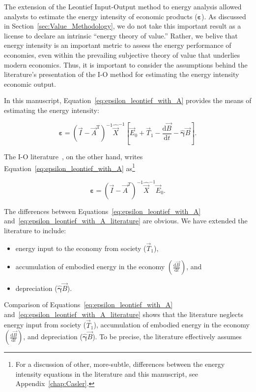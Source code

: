 The extension of the Leontief Input-Output method
to energy analysis allowed analysts to estimate 
the energy intensity 
of economic products ($\bm{\varepsilon}$). 
As discussed in Section~\ref{sec:Value_Methodology},
we do not take this important result as a license
to declare an intrinsic ``energy theory of value.''
Rather, we belive that energy intensity is an 
important metric to assess the energy performance of economies,
even within the prevailing subjective theory of value
that underlies modern economics. 
Thus, it is important to consider the assumptions behind
the literature's presentation of the I-O method 
for estimating the energy intensity economic output.

In this manuscript, Equation~\ref{eq:epsilon_leontief_with_A} 
provides the means of estimating the energy intensity:

\begin{equation*}
	\bm{\varepsilon} 
	= {(\vec{I} - \vec{A}^{\mathrm{T}})}^{-1}\hat{\vec{X}}^{-1}
		\left[\vec{E}_{0} 
				+ \vec{T}_{1} 
				- \frac{\mathrm{d}\vec{B}}{\mathrm{d}t} 
				- \hat{\bm{\gamma}}\vec{B}
		\right].
\end{equation*}

\noindent{}The I-O literature~\cite{Bullard1975,Casler1984}, 
on the other hand, 
writes Equation~\ref{eq:epsilon_leontief_with_A} 
as\footnote{For a discussion of other, more-subtle, differences
between the energy intensity equations in the literature
and this manuscript, see Appendix~\ref{chap:Casler}.}

\begin{equation} \label{eq:epsilon_leontief_with_A_literature}
	\bm{\varepsilon} 
	= {(\vec{I} - \vec{A}^{T})}^{-1}
	\hat{\vec{X}}^{-1}
	\vec{E}_{0}.
\end{equation}

The differences between Equations~\ref{eq:epsilon_leontief_with_A}
and~\ref{eq:epsilon_leontief_with_A_literature} are obvious. 
We have extended the literature to include:

\begin{itemize}
	\item{energy input to the economy from society ($\vec{T}_{1}$),}
	\item{accumulation of embodied energy in the economy 
	$\left( \frac{\mathrm{d}\vec{B}}{\mathrm{d}t} \right)$, and}
	\item{depreciation ($\hat{\bm{\gamma}}\vec{B}$).}
\end{itemize}

\noindent{}Comparison of 
Equations~\ref{eq:epsilon_leontief_with_A}
and~\ref{eq:epsilon_leontief_with_A_literature}
shows that the literature neglects
energy input from society ($\vec{T}_{1}$),
accumulation of embodied energy in the economy 
$\left( \frac{\mathrm{d}\vec{B}}{\mathrm{d}t} \right)$,
and depreciation ($\hat{\bm{\gamma}}\vec{B}$).
To be precise, the literature effectively assumes

